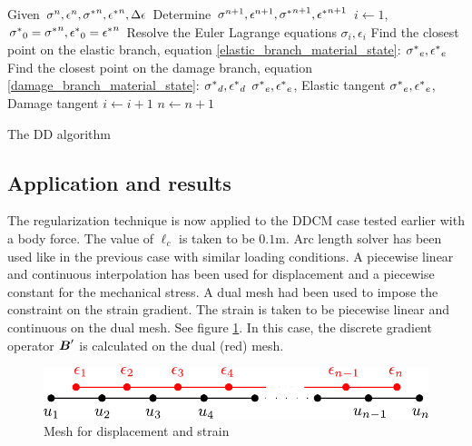 \documentclass[10pt]{elsarticle}
\begin{document}
\begin{algorithm}
	\begin{algorithmic}
		\State Given $\sigma^n, \epsilon^n, \mbox{$\sigma^*$}^n, \mbox{$\epsilon^*$}^n,\Delta \epsilon$ 
		\State Determine $\sigma^{n+1}, \epsilon^{n+1}, \mbox{$\sigma^*$}^{n+1}, \mbox{$\epsilon^*$}^{n+1}$ 
		\State $i \gets 1$, $\mbox{$\sigma^*$}_{0} = \mbox{$\sigma^*$}^{n}, \mbox{$\epsilon^*$}_{0}= \mbox{$\epsilon^*$}^{n}$
			\State Resolve the Euler Lagrange equations
			\State \Return $\sigma_{i}, \epsilon_{i}$
			\EndProcedure
				\State Find the closest point on the elastic branch, equation \ref{elastic_branch_material_state}: $\mbox{$\sigma^*$}_e,\mbox{$\epsilon^*$}_e$
				\State Find the closest point on the damage branch, equation \ref{damage_branch_material_state}: $\mbox{$\sigma^*$}_d,\mbox{$\epsilon^*$}_d$
					\State \Return $\mbox{$\sigma^*$}_e,\mbox{$\epsilon^*$}_e$, Elastic tangent
				\Else
					\State \Return $\mbox{$\sigma^*$}_e,\mbox{$\epsilon^*$}_e$, Damage tangent
				\EndIf
			\EndProcedure
			\State $i \gets i+1$
		\EndWhile 
		\State $n \gets n+1$
	\end{algorithmic}
	\caption{The DD algorithm}\label{alg:the_dd_algorithm}
\end{algorithm}


\subsection{Application and results}
The regularization technique is now applied to the DDCM case tested earlier with a body force. The value of $\ell_c$ is taken to be $0.1\si{\meter}$. Arc length solver has been used like in the previous case with similar loading conditions. A piecewise linear and continuous interpolation has been used for displacement and a piecewise constant for the mechanical stress. A dual mesh had been used to impose the constraint on the strain gradient. The strain is taken to be piecewise linear and continuous on the dual mesh. See figure \ref{mesh_dual_1d}. In this case, the discrete gradient operator $\mbox{\boldmath $B$}'$ is calculated on the dual (red) mesh.

\begin{figure}[ht]
	\centering
	\includegraphics[width=0.5\linewidth]{./mesh_dual_1d.pdf}
	\caption{Mesh for displacement and strain}
	\label{mesh_dual_1d}
\end{figure}
\end{document}
